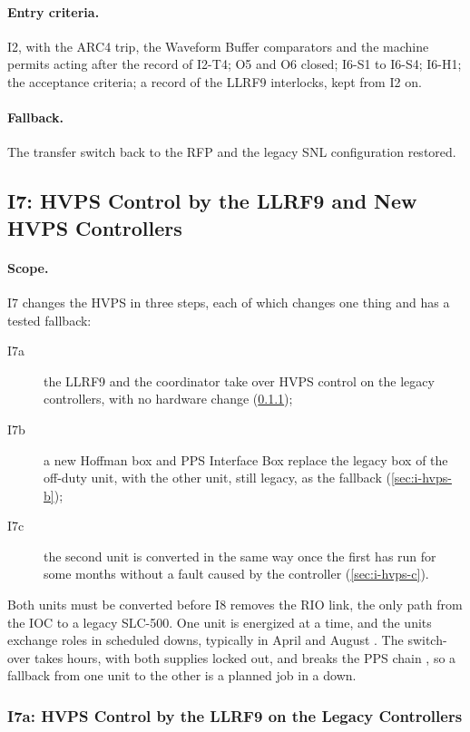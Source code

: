 \paragraph{Entry criteria.} I2, with the ARC4 trip, the Waveform Buffer comparators
and the machine permits acting after the record of I2-T4; O5 and O6 closed; I6-S1 to
I6-S4; I6-H1; the
acceptance criteria; a record of the LLRF9 interlocks, kept from I2 on.

\paragraph{Fallback.} The transfer switch back to the RFP and the legacy SNL
configuration restored.

\subsection{I7: HVPS Control by the LLRF9 and New HVPS Controllers}\label{sec:i-hvps}

\paragraph{Scope.} I7 changes the HVPS in three steps, each of which changes one thing
and has a tested fallback:
\begin{description}
\item[I7a] the LLRF9 and the coordinator take over HVPS control on the legacy
controllers, with no hardware change (\cref{sec:i-hvps-a});
\item[I7b] a new Hoffman box and PPS Interface Box replace the legacy box of the
off-duty unit, with the other unit, still legacy, as the fallback
(\cref{sec:i-hvps-b});
\item[I7c] the second unit is converted in the same way once the first has run for
some months without a fault caused by the controller (\cref{sec:i-hvps-c}).
\end{description}
Both units must be converted before I8 removes the RIO link, the only path from the
IOC to a legacy SLC-500. One unit is energized at a time, and the units exchange roles
in scheduled downs, typically in April and August . The switch-over takes hours,
with both supplies locked out, and breaks the PPS chain , so a fallback from one
unit to the other is a planned job in a down.

\subsubsection{I7a: HVPS Control by the LLRF9 on the Legacy Controllers}\label{sec:i-hvps-a}


